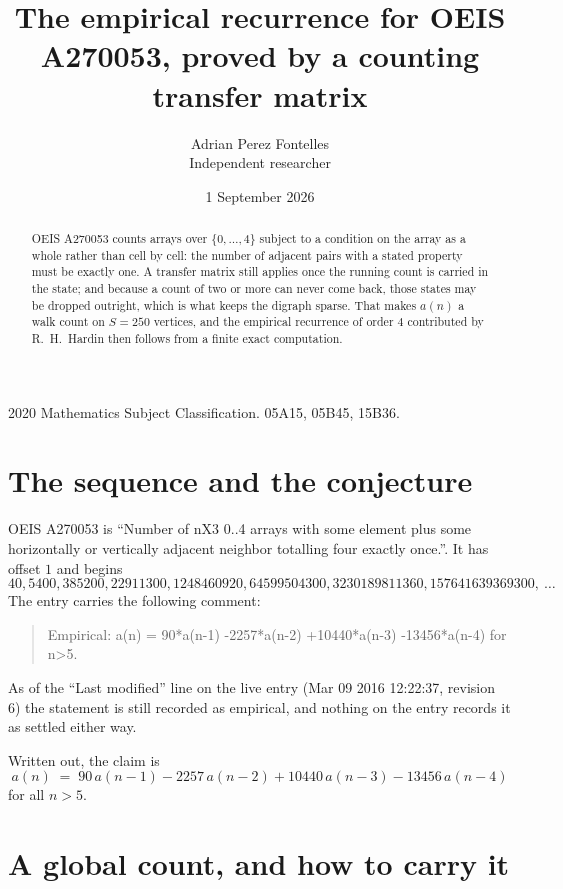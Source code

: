\documentclass[11pt,a4paper]{article}
\title{The empirical recurrence for OEIS A270053, proved by a counting transfer matrix}
\author{Adrian Perez Fontelles\\ \small Independent researcher}
\date{1 September 2026}
\theoremstyle{plain}
\theoremstyle{definition}
\begin{document}
\maketitle

\begin{abstract}
OEIS A270053 counts arrays over $\{0,\dots,4\}$ subject to a condition on the array as a
whole rather than cell by cell: the number of adjacent pairs with a stated property must be
exactly one. A transfer matrix still applies once the running count is carried in the state; and
because a count of two or more can never come back, those states may be dropped outright,
which is what keeps the digraph sparse. That makes $a(n)$ a walk count on $S=250$ vertices,
and the empirical recurrence of order $4$ contributed by R.~H.~Hardin then follows from
a finite exact computation.
\end{abstract}

\noindent\small 2020 Mathematics Subject Classification. 05A15, 05B45, 15B36.\normalsize

\section{The sequence and the conjecture}

OEIS A270053 is ``Number of nX3 0..4 arrays with some element plus some horizontally or vertically adjacent neighbor totalling four exactly once.''. It has offset $1$ and begins
\[
40, 5400, 385200, 22911300, 1248460920, 64599504300, 3230189811360, 157641639369300,\ \dots
\]
The entry carries the following comment:
\begin{quote}\small
Empirical: a(n) = 90*a(n-1) -2257*a(n-2) +10440*a(n-3) -13456*a(n-4) for n>5.
\end{quote}
As of the ``Last modified'' line on the live entry (Mar 09 2016 12:22:37, revision 6) the statement is
still recorded as empirical, and nothing on the entry records it as settled either way.

Written out, the claim is
\begin{equation}\label{eq:conj}
a(n)\;=\;90\,a(n-1) - 2257\,a(n-2) + 10440\,a(n-3) - 13456\,a(n-4)
\end{equation}
for all $n>5$.

\section{A global count, and how to carry it}
\end{document}
